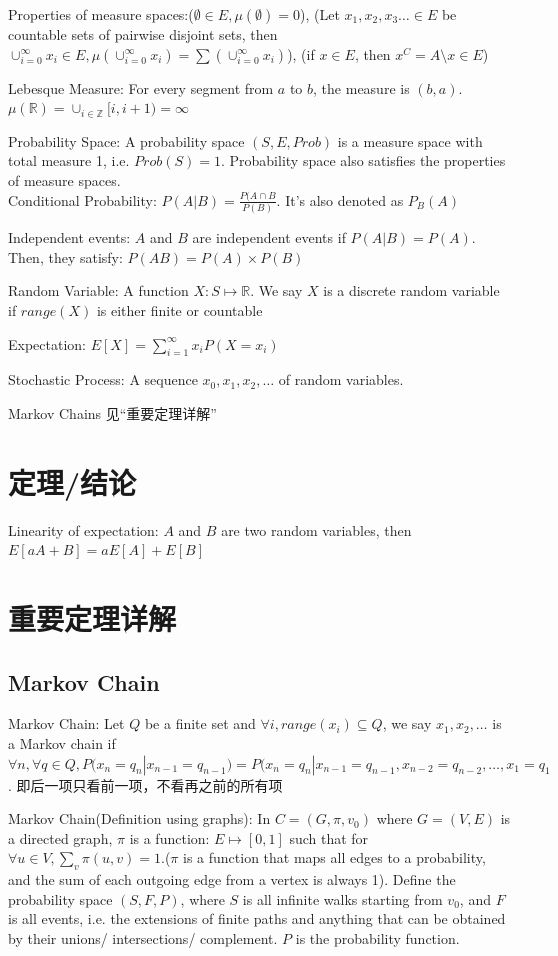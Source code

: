 \documentclass[12pt,a4paper]{ctexrep}
\begin{document}
Properties of measure spaces:($\emptyset \in E, \mu(\emptyset) = 0$), (Let $x_1,x_2,x_3\dots \in E$ be countable sets of pairwise disjoint sets, then $\cup_{i=0}^{\infty} x_i\in E, \mu(\cup_{i=0}^{\infty} x_i) = \sum(\cup_{i=0}^{\infty} x_i)$), (if $x \in E$, then $x^C = A \setminus x \in E$)

Lebesque Measure: For every segment from $a$ to $b$, the measure is $(b,a)$. $\mu(\mathbb{R}) = \cup_{i\in \mathbb{Z}} [i,i+1) = \infty$

Probability Space: A probability space $(S,E,Prob)$ is a measure space with total measure 1, i.e. $Prob(S) = 1$. Probability space also satisfies the properties of measure spaces.\\

Conditional Probability: $P(A|B) = \frac{P(A\cap B}{P(B)}$. It's also denoted as $P_B(A)$

Independent events: $A$ and $B$ are independent events if $P(A|B) = P(A)$. Then, they satisfy: $P(AB) = P(A)\times P(B)$

Random Variable: A function $X: S \mapsto \mathbb{R}$. We say $X$ is a discrete random variable if $range(X)$ is either finite or countable

Expectation: $E[X] = \sum_{i = 1}^{\infty} x_i P(X = x_i)$

Stochastic Process: A sequence $x_0,x_1,x_2,\dots$ of random variables.

Markov Chains 见“重要定理详解”
\section{定理/结论}
Linearity of expectation: $A$ and $B$ are two random variables, then $E[aA+B] = aE[A]+E[B]$
\section{重要定理详解}
\subsection{Markov Chain}
Markov Chain: Let $Q$ be a finite set and $\forall i, range(x_i) \subseteq Q$, we say $x_1,x_2,\dots$ is a Markov chain if $\forall n, \forall q \in Q, P(x_n = q_n|x_{n-1} = q_{n-1}) = P(x_n = q_n|x_{n-1} = q_{n-1},x_{n-2} = q_{n-2},\dots,x_{1} = q_{1}$. 即后一项只看前一项，不看再之前的所有项

Markov Chain(Definition using graphs): In $C = (G,\pi,v_0)$ where $G = (V,E)$ is a directed graph, $\pi$ is a function: $E\mapsto [0,1]$ such that for $\forall u \in V, \sum_{v} \pi(u,v) = 1$.($\pi$ is a function that maps all edges to a probability, and the sum of each outgoing edge from a vertex is always 1). Define the probability space $(S,F,P)$, where $S$ is all infinite walks starting from $v_0$, and $F$ is all events, i.e. the extensions of finite paths and anything that can be obtained by their unions/ intersections/ complement. $P$ is the probability function.
\end{document}
